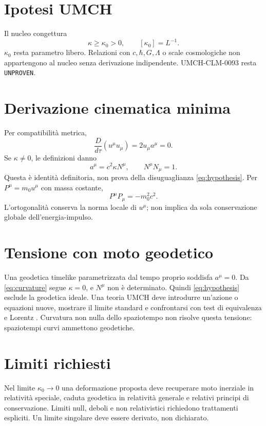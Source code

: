 \documentclass[11pt,a4paper]{article}
\begin{document}
\section{Ipotesi UMCH}\label{sec:hypothesis}
Il nucleo congettura
\begin{equation}\label{eq:hypothesis}
\kappa\ge\kappa_0>0,\qquad [\kappa_0]=L^{-1}.
\end{equation}
$\kappa_0$ resta parametro libero. Relazioni con $c,\hbar,G,\Lambda$ o scale cosmologiche non appartengono al nucleo senza derivazione indipendente. UMCH-CLM-0093 resta \texttt{UNPROVEN}.

\section{Derivazione cinematica minima}\label{sec:derivation}
Per compatibilità metrica,
\begin{equation}\label{eq:orthogonality}
\frac{D}{d\tau}(u^\mu u_\mu)=2u_\mu a^\mu=0.
\end{equation}
Se $\kappa\ne0$, le definizioni danno
\begin{equation}\label{eq:frenet}
a^\mu=c^2\kappa N^\mu,\qquad N^\mu N_\mu=1.
\end{equation}
Questa è identità definitoria, non prova della disuguaglianza \eqref{eq:hypothesis}. Per $P^\mu=m_0u^\mu$ con massa costante,
\begin{equation}\label{eq:momentum}
P^\mu P_\mu=-m_0^2c^2.
\end{equation}
L'ortogonalità conserva la norma locale di $u^\mu$; non implica da sola conservazione globale dell'energia-impulso.

\section{Tensione con moto geodetico}\label{sec:tension}
Una geodetica timelike parametrizzata dal tempo proprio soddisfa $a^\mu=0$. Da \eqref{eq:curvature} segue $\kappa=0$, e $N^\mu$ non è determinato. Quindi \eqref{eq:hypothesis} esclude la geodetica ideale. Una teoria UMCH deve introdurre un'azione o equazioni nuove, mostrare il limite standard e confrontarsi con test di equivalenza e Lorentz \cite{Will2014}. Curvatura non nulla dello spaziotempo non risolve questa tensione: spaziotempi curvi ammettono geodetiche.

\section{Limiti richiesti}\label{sec:limits}
Nel limite $\kappa_0\to0$ una deformazione proposta deve recuperare moto inerziale in relatività speciale, caduta geodetica in relatività generale e relativi principi di conservazione. Limiti null, deboli e non relativistici richiedono trattamenti espliciti. Un limite singolare deve essere derivato, non dichiarato.
\end{document}
